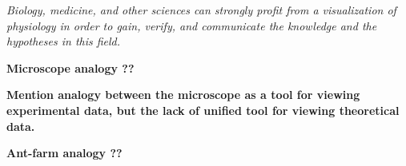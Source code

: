 \textit{Biology, medicine, and other sciences can strongly profit from a visualization of physiology in order to gain, verify, and communicate the knowledge and the hypotheses in this field.}

\textbf{Microscope analogy ??}

\textbf{Mention analogy between the microscope as a tool for viewing experimental data, but the lack of unified tool for viewing theoretical data.}

\textbf{Ant-farm analogy ??}



%
%
%
%
%
%
%
%
%

%
%
%
%
%
%


